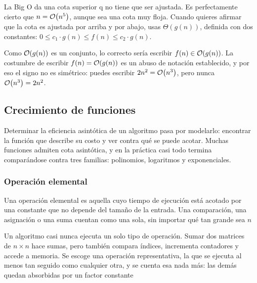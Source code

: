 \documentclass[11pt,letterpaper]{article}
\begin{document}
\vspace{2em}

\begin{ojo}
  La Big O da una cota superior q no tiene que ser ajustada. Es
  perfectamente cierto que $n = \mathcal{O}\!\left(n^5\right)$, aunque sea una cota muy
  floja. Cuando quieres afirmar que la cota es ajustada por arriba y
  por abajo, usas $\Theta(g(n))$, definida con dos constantes:
  $0 \leq c_1 \cdot g(n) \leq f(n) \leq c_2 \cdot g(n)$.
\end{ojo}

\vspace{2em}

\begin{ojo}
  Como $\mathcal{O}\!\left(g(n)\right)$ es un conjunto, lo correcto sería escribir
  $f(n) \in \mathcal{O}\!\left(g(n)\right)$. La costumbre de escribir $f(n) = \mathcal{O}\!\left(g(n)\right)$
  es un abuso de notación establecido, y por eso el signo no es
  simétrico: puedes escribir $2n^2 = \mathcal{O}\!\left(n^3\right)$, pero nunca
  $\mathcal{O}\!\left(n^3\right) = 2n^2$.
\end{ojo}

\subsection*{Crecimiento de funciones}

Determinar la eficiencia asintótica de un algoritmo pasa por
modelarlo: encontrar la función que describe su costo y ver contra
qué se puede acotar. Muchas funciones admiten cota asintótica, y en
la práctica casi todo termina comparándose contra tres familias:
polinomios, logaritmos y exponenciales.

\subsubsection*{Operación elemental}

\begin{definicion}
  Una operación elemental es aquella cuyo tiempo de ejecución está
  acotado por una constante que no depende del tamaño de la entrada.
  Una comparación, una asignación o una suma cuentan como una sola,
  sin importar qué tan grande sea $n$
\end{definicion}

Un algoritmo casi nunca ejecuta un solo tipo de operación. Sumar dos
matrices de $n \times n$ hace sumas, pero también compara índices,
incrementa contadores y accede a memoria. Se escoge una operación
representativa, la que se ejecuta al menos tan seguido como
cualquier otra, y se cuenta esa nada más: las demás quedan
absorbidas por un factor constante
\end{document}
